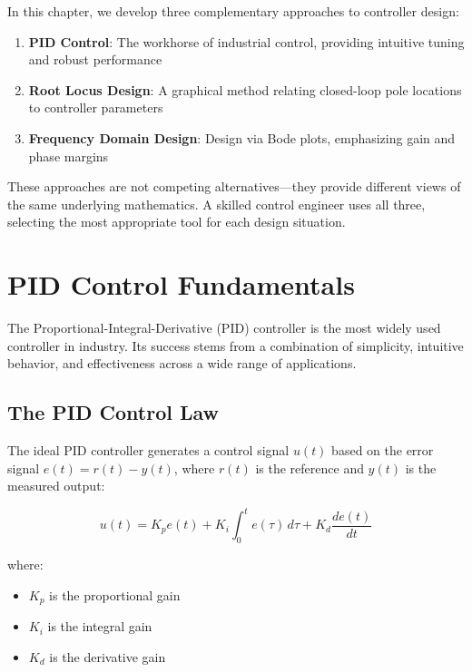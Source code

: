 In this chapter, we develop three complementary approaches to controller design:

\begin{enumerate}
    \item \textbf{PID Control}: The workhorse of industrial control, providing intuitive tuning and robust performance
    \item \textbf{Root Locus Design}: A graphical method relating closed-loop pole locations to controller parameters
    \item \textbf{Frequency Domain Design}: Design via Bode plots, emphasizing gain and phase margins
\end{enumerate}

These approaches are not competing alternatives---they provide different views of the same underlying mathematics. A skilled control engineer uses all three, selecting the most appropriate tool for each design situation.

\section{PID Control Fundamentals}
\label{sec:pid_fundamentals}

The Proportional-Integral-Derivative (PID) controller is the most widely used controller in industry. Its success stems from a combination of simplicity, intuitive behavior, and effectiveness across a wide range of applications.

\subsection{The PID Control Law}
\label{subsec:pid_control_law}

The ideal PID controller generates a control signal $u(t)$ based on the error signal $e(t) = r(t) - y(t)$, where $r(t)$ is the reference and $y(t)$ is the measured output:

\begin{equation}
\boxed{
u(t) = K_p e(t) + K_i \int_0^t e(\tau) \, d\tau + K_d \frac{de(t)}{dt}
}
\label{eq:pid_time_domain}
\end{equation}

where:
\begin{itemize}
    \item $K_p$ is the proportional gain
    \item $K_i$ is the integral gain
    \item $K_d$ is the derivative gain
\end{itemize}

